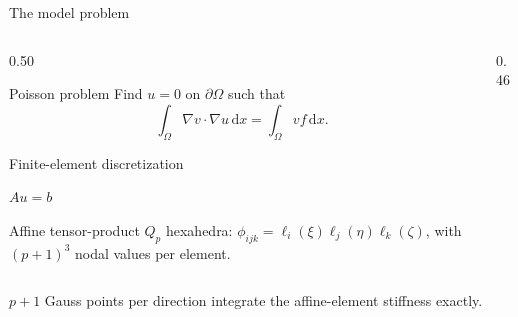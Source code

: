 \documentclass[aspectratio=169,11pt]{beamer}
\newcommand{\ordercube}[3]{%
  \begin{scope}[shift={(#2,#3)}]
    \def\cubesize{1.35}
    \def\cubedepth{0.28}
    \pgfmathsetmacro{\dotradius}{max(0.65,1.8-0.14*#1)}
    \fill[pale] (0,0) rectangle (\cubesize,\cubesize);
    \fill[blue!10] (0,\cubesize) -- (\cubedepth,\cubesize+\cubedepth)
      -- (\cubesize+\cubedepth,\cubesize+\cubedepth)
      -- (\cubesize,\cubesize) -- cycle;
    \fill[teal!10] (\cubesize,0) -- (\cubesize+\cubedepth,\cubedepth)
      -- (\cubesize+\cubedepth,\cubesize+\cubedepth)
      -- (\cubesize,\cubesize) -- cycle;
    \draw[ink,line width=0.7pt] (0,0) rectangle (\cubesize,\cubesize)
      (0,\cubesize) -- (\cubedepth,\cubesize+\cubedepth)
      -- (\cubesize+\cubedepth,\cubesize+\cubedepth)
      -- (\cubesize,\cubesize)
      (\cubesize,0) -- (\cubesize+\cubedepth,\cubedepth)
      -- (\cubesize+\cubedepth,\cubesize+\cubedepth);
    \foreach \i in {0,...,#1} {
      \foreach \j in {0,...,#1} {
        \fill[teal] ({\i*\cubesize/#1},{\j*\cubesize/#1}) circle (\dotradius pt);
        \fill[teal] ({\i*\cubesize/#1+\j*\cubedepth/#1},
          {\cubesize+\j*\cubedepth/#1}) circle (\dotradius pt);
        \fill[teal] ({\cubesize+\i*\cubedepth/#1},
          {\j*\cubesize/#1+\i*\cubedepth/#1}) circle (\dotradius pt);
      }
    }
    \node[font=\scriptsize,text=ink] at (0.81,-0.32) {$p=#1$};
  \end{scope}%
}
\begin{document}
\begin{frame}{The model problem}
  \vspace{0.2cm}
  \begin{columns}[T,onlytextwidth]
    \begin{column}{0.50\textwidth}
      \begin{block}{Poisson problem}
        Find $u=0$ on $\partial\Omega$ such that
        \[
          \int_{\Omega}\nabla v\cdot\nabla u\,\mathrm{d}x
          = \int_{\Omega}v f\,\mathrm{d}x.
        \]
        \vspace{-0.18cm}
        \begin{center}
          {\small\color{muted}Finite-element discretization}\par\vspace{0.03cm}
          {\Large $A u=b$}
        \end{center}
        \vspace{-0.28cm}
      \end{block}
      \vspace{0.10cm}
      {\small Affine tensor-product $Q_p$ hexahedra:
       $\phi_{ijk}=\ell_i(\xi)\ell_j(\eta)\ell_k(\zeta)$,
       with $(p+1)^3$ nodal values per element.\par}
    \end{column}
    \begin{column}{0.46\textwidth}
      \centering
    \end{column}
  \end{columns}
  \vspace{0.08cm}
  \begin{center}
    {\small\color{ink}$p+1$ Gauss points per direction integrate the
    affine-element stiffness exactly.}
  \end{center}
\end{frame}
\end{document}
